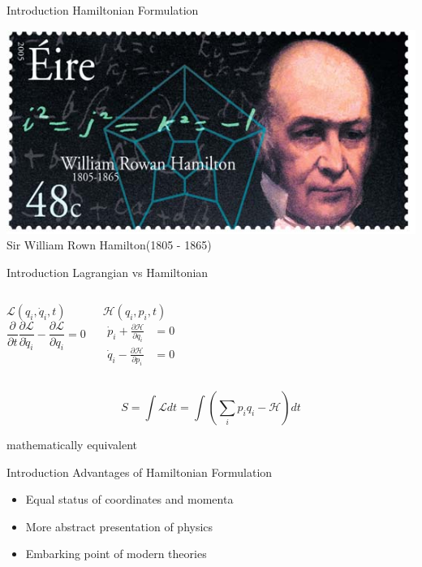 \documentclass[xcolor=dvipsnames]{beamer}
\begin{document}
	\begin{frame}{Introduction}
		Hamiltonian Formulation
		\begin{center}
			\includegraphics[scale=1.0]{hamilton.jpg}\\
			\tiny{Sir William Rown Hamilton(1805 - 1865)}
		\end{center}
	\end{frame}
	\begin{frame}{Introduction}
		Lagrangian vs Hamiltonian
		\begin{columns}[c]
			\column{2in}
			\begin{center}
				$\mathcal{L}(q_{i}, {\dot q}_{i}, t)$
				\begin{equation*}
					\frac{\partial}{\partial t}\frac{\partial \mathcal{L}}{\partial {\dot q_{i}}} - \frac{\partial \mathcal{L}}{\partial q_{i}} = 0
				\end{equation*}	
			\end{center}
			\column{2in}
			\begin{center}
				$\mathcal{H}(q_{i}, p_{i}, t)$	
				\begin{align*}
					{\dot p}_{i} + \frac{\partial \mathcal{H}}{\partial q_{i}} &= 0	\\
					{\dot q}_{i} - \frac{\partial \mathcal{H}}{\partial p_{i}} &= 0
				\end{align*}
			\end{center}
		\end{columns}
		\pause
		\[
		S = \int \mathcal{L} dt = \int \left(\sum_{i}p_{i}q_{i} - \mathcal{H}\right) dt
		\]
		\pause
		\begin{center}
			\Large{mathematically equivalent}
		\end{center}
	\end{frame}
	\begin{frame}{Introduction}
		Advantages of Hamiltonian Formulation
		\begin{itemize}
			\item{Equal status of coordinates and momenta}
			\item{More abstract presentation of physics}
			\item{Embarking point of modern theories}
		\end{itemize}
	\end{frame}
\end{document}

